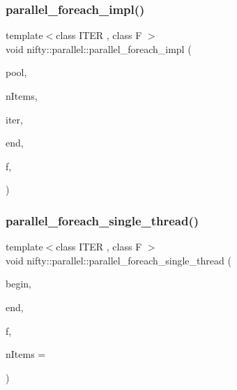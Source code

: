 \subsubsection{\texorpdfstring{parallel\+\_\+foreach\+\_\+impl()}{parallel\_foreach\_impl()}\hspace{0.1cm}{\footnotesize\ttfamily [3/3]}}
{\footnotesize\ttfamily template$<$class I\+T\+ER , class F $>$ \\
void nifty\+::parallel\+::parallel\+\_\+foreach\+\_\+impl (\begin{DoxyParamCaption}\item[{\hyperlink{classnifty_1_1parallel_1_1ThreadPool}{Thread\+Pool} \&}]{pool,  }\item[{const std\+::ptrdiff\+\_\+t}]{n\+Items,  }\item[{I\+T\+ER}]{iter,  }\item[{I\+T\+ER}]{end,  }\item[{F \&\&}]{f,  }\item[{std\+::input\+\_\+iterator\+\_\+tag}]{ }\end{DoxyParamCaption})\hspace{0.3cm}{\ttfamily [inline]}}

\mbox{\label{group__ParallelProcessing_ga53b7128ccb1cf52e5646440337ce4ece}} 
\subsubsection{\texorpdfstring{parallel\+\_\+foreach\+\_\+single\+\_\+thread()}{parallel\_foreach\_single\_thread()}}
{\footnotesize\ttfamily template$<$class I\+T\+ER , class F $>$ \\
void nifty\+::parallel\+::parallel\+\_\+foreach\+\_\+single\+\_\+thread (\begin{DoxyParamCaption}\item[{I\+T\+ER}]{begin,  }\item[{I\+T\+ER}]{end,  }\item[{F \&\&}]{f,  }\item[{const std\+::ptrdiff\+\_\+t}]{n\+Items = {} }\end{DoxyParamCaption})\hspace{0.3cm}{\ttfamily [inline]}}

